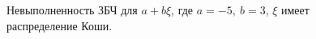 \documentclass[12pt, a4paper]{article}
\begin{document}
\begin{figure}[H]
\caption{Невыполненность ЗБЧ для $a+b\xi$, где $a=-5,\ b=3$, $\xi$ имеет распределение Коши.}
\end{figure}
\end{document}
